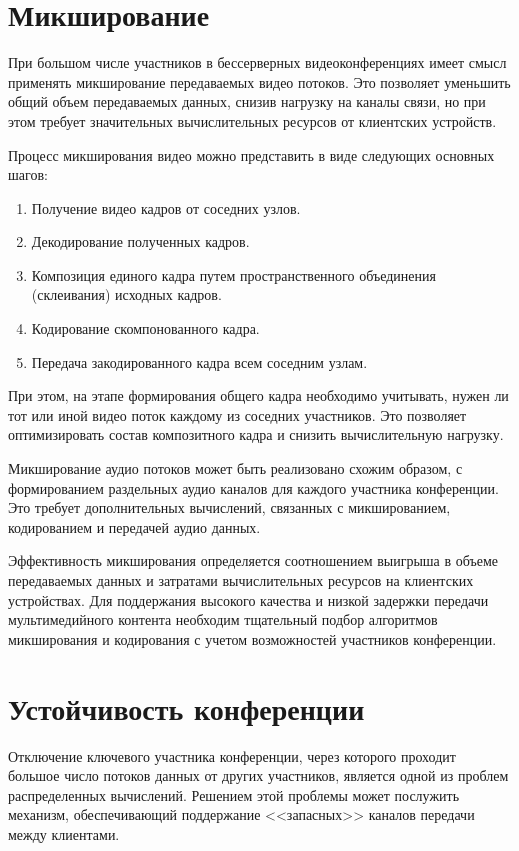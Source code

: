 \section{Микширование}

При большом числе участников в бессерверных видеоконференциях имеет смысл применять микширование передаваемых видео потоков. Это позволяет уменьшить общий объем передаваемых данных, снизив нагрузку на каналы связи, но при этом требует значительных вычислительных ресурсов от клиентских устройств.

Процесс микширования видео можно представить в виде следующих основных шагов:

\begin{enumerate}
\item Получение видео кадров от соседних узлов.
\item Декодирование полученных кадров.
\item Композиция единого кадра путем пространственного объединения (склеивания) исходных кадров.
\item Кодирование скомпонованного кадра.
\item Передача закодированного кадра всем соседним узлам.
\end{enumerate}

При этом, на этапе формирования общего кадра необходимо учитывать, нужен ли тот или иной видео поток каждому из соседних участников. Это позволяет оптимизировать состав композитного кадра и снизить вычислительную нагрузку.

Микширование аудио потоков может быть реализовано схожим образом, с формированием раздельных аудио каналов для каждого участника конференции. Это требует дополнительных вычислений, связанных с микшированием, кодированием и передачей аудио данных.

Эффективность микширования определяется соотношением выигрыша в объеме передаваемых данных и затратами вычислительных ресурсов на клиентских устройствах. Для поддержания высокого качества и низкой задержки передачи мультимедийного контента необходим тщательный подбор алгоритмов микширования и кодирования с учетом возможностей участников конференции.

\section{Устойчивость конференции}

Отключение ключевого участника конференции, через которого проходит большое число потоков данных от других участников, является одной из проблем распределенных вычислений. Решением этой проблемы может послужить механизм, обеспечивающий поддержание <<запасных>> каналов передачи между клиентами.

